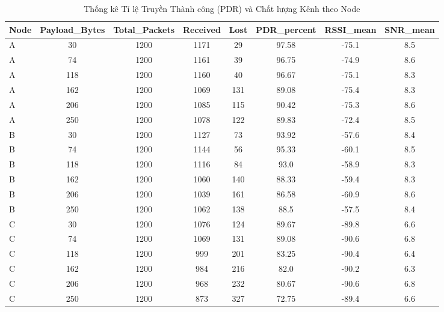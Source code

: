 \begin{table}[htbp]
\centering
\caption{Thống kê Tỉ lệ Truyền Thành công (PDR) và Chất lượng Kênh theo Node}
\label{tab:pdr_summary}
\begin{tabular}{lccccccc}
\toprule
Node & Payload\_Bytes & Total\_Packets & Received & Lost & PDR\_percent & RSSI\_mean & SNR\_mean \\
\midrule
A & 30 & 1200 & 1171 & 29 & 97.58 & -75.1 & 8.5 \\
A & 74 & 1200 & 1161 & 39 & 96.75 & -74.9 & 8.6 \\
A & 118 & 1200 & 1160 & 40 & 96.67 & -75.1 & 8.3 \\
A & 162 & 1200 & 1069 & 131 & 89.08 & -75.4 & 8.3 \\
A & 206 & 1200 & 1085 & 115 & 90.42 & -75.3 & 8.6 \\
A & 250 & 1200 & 1078 & 122 & 89.83 & -72.4 & 8.5 \\
B & 30 & 1200 & 1127 & 73 & 93.92 & -57.6 & 8.4 \\
B & 74 & 1200 & 1144 & 56 & 95.33 & -60.1 & 8.5 \\
B & 118 & 1200 & 1116 & 84 & 93.0 & -58.9 & 8.3 \\
B & 162 & 1200 & 1060 & 140 & 88.33 & -59.4 & 8.3 \\
B & 206 & 1200 & 1039 & 161 & 86.58 & -60.9 & 8.6 \\
B & 250 & 1200 & 1062 & 138 & 88.5 & -57.5 & 8.4 \\
C & 30 & 1200 & 1076 & 124 & 89.67 & -89.8 & 6.6 \\
C & 74 & 1200 & 1069 & 131 & 89.08 & -90.6 & 6.8 \\
C & 118 & 1200 & 999 & 201 & 83.25 & -90.4 & 6.4 \\
C & 162 & 1200 & 984 & 216 & 82.0 & -90.2 & 6.3 \\
C & 206 & 1200 & 968 & 232 & 80.67 & -90.6 & 6.8 \\
C & 250 & 1200 & 873 & 327 & 72.75 & -89.4 & 6.6 \\
\bottomrule
\end{tabular}
\end{table}
